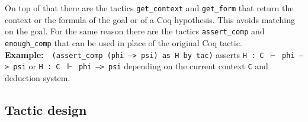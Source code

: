 \documentclass[12pt, a4paper]{article}
\newcommand{\coq}[1]{\texttt{#1}}
\newcommand{\example}[1]{\medskip\\\textbf{Example:}~~#1}
\begin{document}
\medskip\noindent
On top of that there are the tactics \texttt{get\_context} and \texttt{get\_form} that return the context or the formula of the goal or of a Coq hypothesis.
This avoids matching on the goal.
For the same reason there are the tactics \texttt{assert\_comp} and \texttt{enough\_comp} that can be used in place of the original Coq tactic.
\example{\coq{(assert_comp (phi --> psi) as H by tac)} asserts \texttt{H : C $\vdash$ phi --> psi} or \texttt{H : C $\Vdash$ phi --> psi} depending on the current context \texttt{C} and deduction system.}



\subsection{Tactic design}
\end{document}
